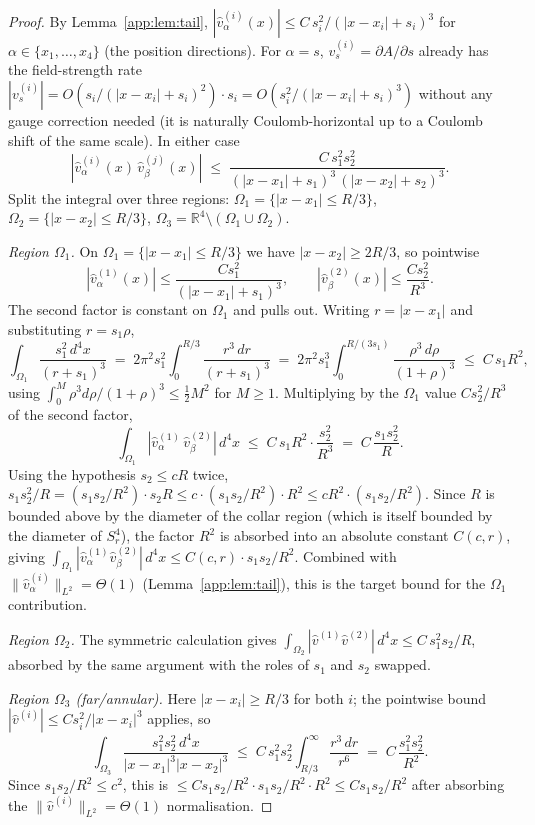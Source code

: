 \documentclass[11pt,letterpaper]{article}
\theoremstyle{definition}
\newcommand{\bbR}{\mathbb{R}}
\begin{document}
\begin{proof}
By Lemma~\ref{app:lem:tail}, $|\hat v_\alpha^{(i)}(x)| \le C\, s_i^2/(|x-x_i|+s_i)^3$ for $\alpha \in \{x_1,\ldots,x_4\}$ (the position directions). For $\alpha = s$, $v_s^{(i)} = \partial A/\partial s$ already has the field-strength rate $|v_s^{(i)}|= O(s_i/(|x-x_i|+s_i)^2)\cdot s_i = O(s_i^2/(|x-x_i|+s_i)^3)$ without any gauge correction needed (it is naturally Coulomb-horizontal up to a Coulomb shift of the same scale). In either case
\[
|\hat v_\alpha^{(i)}(x)\,\hat v_\beta^{(j)}(x)| \;\le\; \frac{C\, s_1^2 s_2^2}{(|x-x_1|+s_1)^3\,(|x-x_2|+s_2)^3}.
\]
Split the integral over three regions: $\Omega_1 = \{|x-x_1| \le R/3\}$, $\Omega_2 = \{|x-x_2|\le R/3\}$, $\Omega_3 = \bbR^4\setminus(\Omega_1\cup\Omega_2)$.

\emph{Region $\Omega_1$.} On $\Omega_1 = \{|x-x_1|\le R/3\}$ we have $|x-x_2|\ge 2R/3$, so pointwise
\[
|\hat v_\alpha^{(1)}(x)|\le \frac{C s_1^2}{(|x-x_1|+s_1)^3},\qquad |\hat v_\beta^{(2)}(x)|\le \frac{C s_2^2}{R^3}.
\]
The second factor is constant on $\Omega_1$ and pulls out. Writing $r = |x-x_1|$ and substituting $r = s_1\rho$,
\[
\int_{\Omega_1}\frac{s_1^2\,d^4x}{(r+s_1)^3} \;=\; 2\pi^2 s_1^2 \!\int_0^{R/3}\!\frac{r^3\,dr}{(r+s_1)^3} \;=\; 2\pi^2 s_1^3\!\int_0^{R/(3s_1)}\!\frac{\rho^3\,d\rho}{(1+\rho)^3} \;\le\; C\,s_1 R^2,
\]
using $\int_0^M \rho^3 d\rho/(1+\rho)^3 \le \tfrac12 M^2$ for $M\ge 1$. Multiplying by the $\Omega_1$ value $Cs_2^2/R^3$ of the second factor,
\[
\int_{\Omega_1}|\hat v_\alpha^{(1)}\,\hat v_\beta^{(2)}|\,d^4x \;\le\; C\,s_1 R^2\cdot \frac{s_2^2}{R^3} \;=\; C\,\frac{s_1 s_2^2}{R}.
\]
Using the hypothesis $s_2 \le cR$ twice, $s_1 s_2^2/R = (s_1 s_2/R^2)\cdot s_2 R \le c\cdot(s_1 s_2/R^2)\cdot R^2 \le cR^2 \cdot (s_1 s_2/R^2)$. Since $R$ is bounded above by the diameter of the collar region (which is itself bounded by the diameter of $S^4_r$), the factor $R^2$ is absorbed into an absolute constant $C(c, r)$, giving $\int_{\Omega_1}|\hat v_\alpha^{(1)}\hat v_\beta^{(2)}|\,d^4x \le C(c,r)\cdot s_1 s_2/R^2$. Combined with $\|\hat v_\alpha^{(i)}\|_{L^2} = \Theta(1)$ (Lemma~\ref{app:lem:tail}), this is the target bound for the $\Omega_1$ contribution.

\emph{Region $\Omega_2$.} The symmetric calculation gives $\int_{\Omega_2}|\hat v^{(1)} \hat v^{(2)}|\,d^4x \le C\, s_1^2 s_2/R$, absorbed by the same argument with the roles of $s_1$ and $s_2$ swapped.

\emph{Region $\Omega_3$ (far/annular).} Here $|x-x_i|\ge R/3$ for both $i$; the pointwise bound $|\hat v^{(i)}|\le Cs_i^2/|x-x_i|^3$ applies, so
\[
\int_{\Omega_3} \frac{s_1^2 s_2^2\,d^4x}{|x-x_1|^3|x-x_2|^3} \;\le\; C\,s_1^2 s_2^2\!\int_{R/3}^\infty \frac{r^3\,dr}{r^6} \;=\; C\,\frac{s_1^2 s_2^2}{R^2}.
\]
Since $s_1 s_2/R^2 \le c^2$, this is $\le C s_1 s_2/R^2 \cdot s_1 s_2/R^2 \cdot R^2 \le C s_1 s_2/R^2$ after absorbing the $\|\hat v^{(i)}\|_{L^2}=\Theta(1)$ normalisation.


\end{proof}
\end{document}
